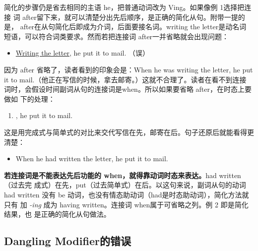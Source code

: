 简化的步骤仍是省去相同的主语 he，把普通动词改为 Ving。如果像例 1选择把连接
词 after留下来，就可以清楚分出先后顺序，是正确的简化从句。附带一提的
是， after在从句简化后即成为介词，后面要接名词。writing the letter是动名词
短语，可以符合词类要求。然而若把连接词 after一并省略就会出现问题：
\begin{itemize}
\item \ul{Writing the letter}, he put it to mail. （误）
\end{itemize}
因为 after 省略了，读者看到的印象会是：When he was writing the letter, he
put it to mail.（他正在写信的时候，拿去邮寄。）这就不合理了。读者在看不到连接
词时，会假设时间副词从句的连接词是when。所以如果要省略 after，在时态上要做如
下的处理：
\begin{enumerate}[resume]
\item {}, he put it to mail.
\end{enumerate}
这是用完成式与简单式的对比来交代写信在先，邮寄在后。句子还原后就能看得更清楚：
\begin{itemize}
\item When he had written the letter, he put it to mail.
\end{itemize}
\textbf{若连接词是不能表达先后功能的 when，就得靠动词时态来表达。}had written（过去完
成式）在先，put（过去简单式）在后。以这句来说，副词从句的动词had
written 没有 be 动词，也没有情态助动词（had是时态助动词），简化方法就只有
加 \emph{-ing} 成为 having written。连接词 when属于可省略之列。例 2 即是简化结果，也
是正确的简化从句做法。

\subsection{Dangling Modifier的错误}

